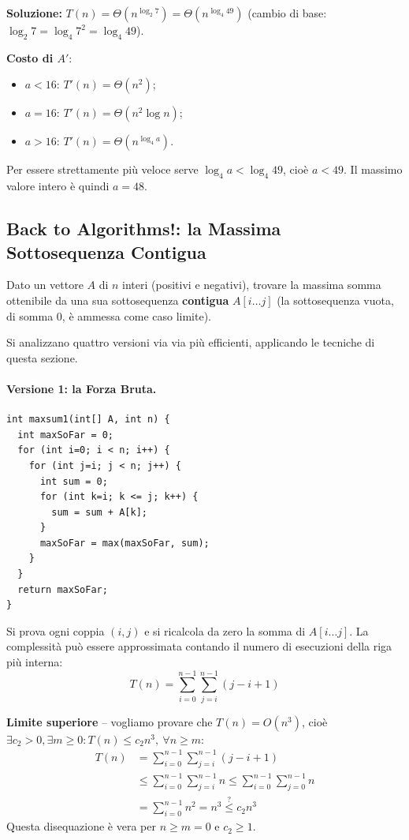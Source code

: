 \documentclass[12pt, a4paper]{article}
\begin{document}
\textbf{Soluzione:} $T(n)=\Theta(n^{\log_2 7})=\Theta(n^{\log_4 49})$ (cambio di base: $\log_2 7 = \log_4 7^2 = \log_4 49$).

\textbf{Costo di $A'$}:
\begin{itemize}
    \item $a<16$: $T'(n)=\Theta(n^2)$;
    \item $a=16$: $T'(n)=\Theta(n^2\log n)$;
    \item $a>16$: $T'(n)=\Theta(n^{\log_4 a})$.
\end{itemize}
Per essere strettamente più veloce serve $\log_4 a < \log_4 49$, cioè $a<49$. Il massimo valore intero è quindi $\boxed{a=48}$.


\subsection{Back to Algorithms!: la Massima Sottosequenza Contigua}
\label{sec:massima-sottosequenza}

\begin{tcolorbox}[colback=lightergray!5, colframe=tocsubsec, title=\textbf{Il Problema (dedotto dal codice, non da una definizione esplicita in slide)}]
Dato un vettore $A$ di $n$ interi (positivi e negativi), trovare la massima somma ottenibile da una sua sottosequenza \textbf{contigua} $A[i\ldots j]$ (la sottosequenza vuota, di somma $0$, è ammessa come caso limite).
\end{tcolorbox}

Si analizzano quattro versioni via via più efficienti, applicando le tecniche di questa sezione.

\paragraph{Versione 1: la Forza Bruta.}
\begin{verbatim}
int maxsum1(int[] A, int n) {
  int maxSoFar = 0;
  for (int i=0; i < n; i++) {
    for (int j=i; j < n; j++) {
      int sum = 0;
      for (int k=i; k <= j; k++) {
        sum = sum + A[k];
      }
      maxSoFar = max(maxSoFar, sum);
    }
  }
  return maxSoFar;
}
\end{verbatim}
Si prova ogni coppia $(i,j)$ e si ricalcola da zero la somma di $A[i\ldots j]$. La complessità può essere approssimata contando il numero di esecuzioni della riga più interna:
$$T(n) = \sum_{i=0}^{n-1}\sum_{j=i}^{n-1}(j-i+1)$$

\textbf{Limite superiore} -- vogliamo provare che $T(n)=O(n^3)$, cioè $\exists c_2>0,\exists m\ge 0: T(n)\le c_2n^3,\ \forall n\ge m$:
\begin{align*}
T(n) &= \sum_{i=0}^{n-1}\sum_{j=i}^{n-1}(j-i+1) \\
     &\le \sum_{i=0}^{n-1}\sum_{j=i}^{n-1} n \le \sum_{i=0}^{n-1}\sum_{j=0}^{n-1} n \\
     &= \sum_{i=0}^{n-1} n^2 = n^3 \overset{?}{\le} c_2n^3
\end{align*}
Questa disequazione è vera per $n\ge m=0$ e $c_2\ge 1$.
\end{document}
